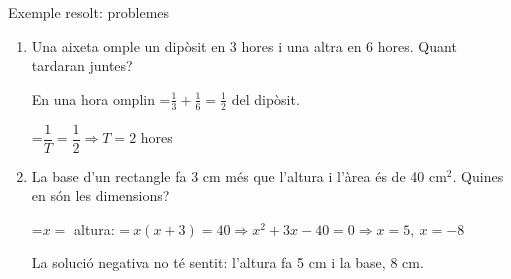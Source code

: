 \documentclass[11pt,a4paper]{article}
\newcommand{\fmm}[1]{\setbox0=\hbox{$#1$}\ifdim\wd0>\linewidth\fmdisp{#1}\else\mbox{\box0}\fi}
\newcommand{\fmdisp}[1]{\[\setbox2=\hbox{$\displaystyle #1$}\ifdim\wd2>\linewidth\resizebox{\linewidth}{!}{\box2}\else\box2\fi\]}
\begin{document}
\begin{fmex}{Exemple resolt: problemes}
\begin{enumerate}[label=\textbf{\arabic*.},leftmargin=*]
\item Una aixeta omple un dipòsit en 3 hores i una altra en 6 hores. Quant tardaran juntes?

En una hora omplin \fmm{\frac13+\frac16=\frac12} del dipòsit.

\fmm{\dfrac1T=\dfrac12\Rightarrow T=2} hores
\item La base d'un rectangle fa 3 cm més que l'altura i l'àrea és de 40 cm$^2$. Quines en són les dimensions?

\fmm{x=} altura: \fmm{\ x(x+3)=40\Rightarrow x^2+3x-40=0\Rightarrow x=5,\ x=-8}

La solució negativa no té sentit: l'altura fa 5 cm i la base, 8 cm.
\end{enumerate}
\end{fmex}

  
\end{document}
